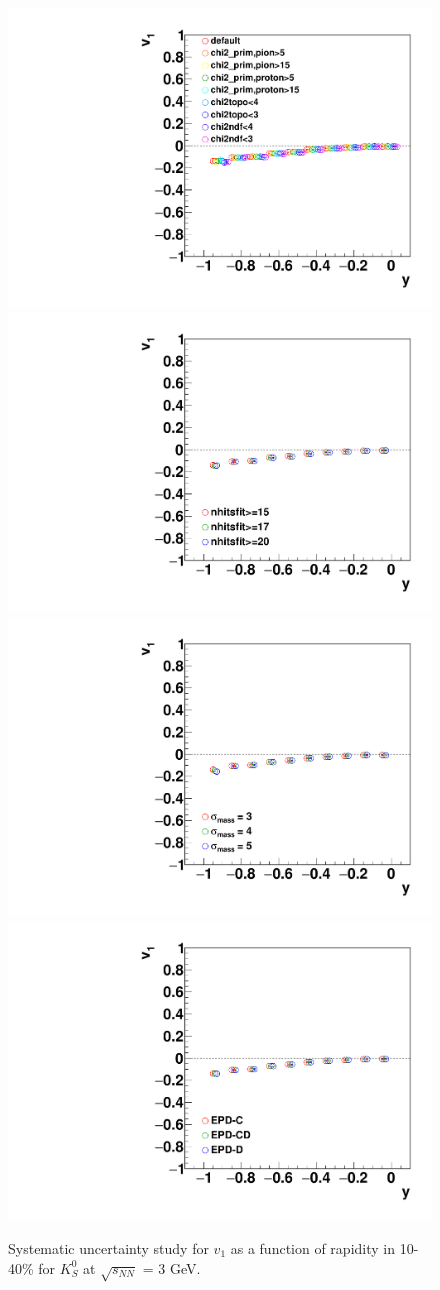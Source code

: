 \begin{figure}[h]
\includegraphics[width=0.49\linewidth]{chapterX/fig/ks_sys_cut_v1.pdf}
\includegraphics[width=0.49\linewidth]{chapterX/fig/ks_sys_cut_v1_nhits.pdf}
\includegraphics[width=0.49\linewidth]{FXT3gev/chapterX/fig/ks_sys_cut_v1_msigma.pdf}
\includegraphics[width=0.49\linewidth]{FXT3gev/chapterX/fig/ks_sys_cut_v1_epdres.pdf}
\caption{Systematic uncertainty study for $v_{1}$ as a function of rapidity in 10-40\% for $K^0_S$ at $\sqrt{s_{NN}}$ = 3 GeV.}
\label{ks_v1y_sys}
\end{figure}

